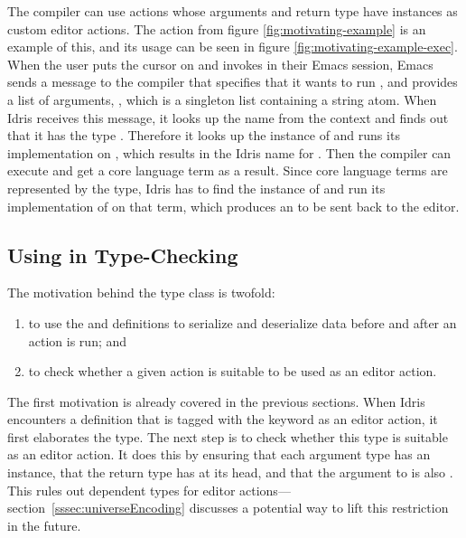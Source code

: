 The compiler can use \Elab{} actions whose arguments and return type have
\Editorable{} instances as custom editor actions. The  action from
figure \ref{fig:motivating-example} is an example of this, and its usage can be
seen in figure \ref{fig:motivating-example-exec}.
When the user puts the cursor on  and invokes
 in their Emacs session, Emacs sends a message to the compiler
that specifies that it wants to run , and provides a list of
arguments, , which is a singleton list
containing a string atom. When Idris receives this message, it looks up the
name  from the context and finds out that it has the type
. Therefore it looks up the \Editorable{}
instance of  and runs its  implementation on , which
results in the Idris name for . Then the compiler can execute
 and get a core language term \dt{()} as a result. Since core
language terms are represented by the \TT{} type, Idris has to find the
\Editorable{} instance of \TT{} and run its implementation of  on that term,
which produces an \sexp{} to be sent back to the editor.

\subsection{Using \Editorable{} in Type-Checking}
\label{ssec:typechecking}

The motivation behind the  type class is twofold:
\begin{enumerate}
\item to use the  and  definitions to serialize
  and deserialize data before and after an \Elab{} action is run; and
\item to check whether a given \Elab{} action is suitable to be used as an
  editor action.
\end{enumerate}

The first motivation is already covered in the previous sections.
When Idris encounters a definition that is tagged with the 
keyword as an editor action, it first elaborates the type.
The next step is to check whether this type is suitable as an editor action.
It does this by ensuring that each argument type has an \Editorable{} instance,
that the return type has \Elab{} at its head, and that the argument to \Elab{}
is also \Editorable{}.
This rules out dependent types for editor
actions---section~\ref{sssec:universeEncoding} discusses a potential way to lift
this restriction in the future.

